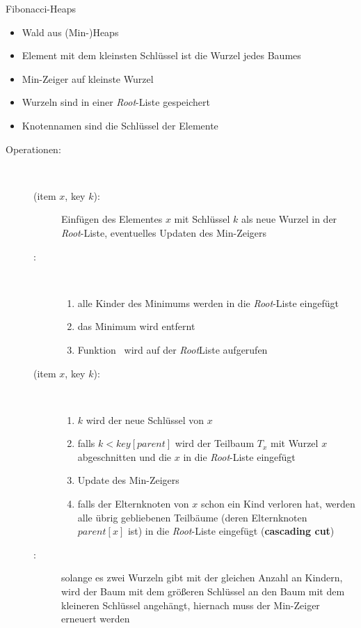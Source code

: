 \begin{TOP}{Fibonacci-Heaps}
\up\up\begin{itemize}
	\item Wald aus (Min-)Heaps
	\item Element mit dem kleinsten Schlüssel ist die Wurzel jedes Baumes
	\item Min-Zeiger auf kleinste Wurzel
	\item Wurzeln sind in einer \textit{Root}-Liste gespeichert
	\item Knotennamen sind die Schlüssel der Elemente
\end{itemize}

\begin{description}
	\item[Operationen:]\ \\\up
	\begin{description}
		\item[\insert(item $x$, key $k$):] Einfügen des Elementes $x$ mit Schlüssel $k$ als neue Wurzel in der \textit{Root}-Liste, eventuelles Updaten des Min-Zeigers
		\item[\exMin:]\ \\\up
			\begin{enumerate}
				\item alle Kinder des Minimums werden in die \textit{Root}-Liste eingefügt
				\item das Minimum wird entfernt
				\item Funktion \cons~wird auf der \textit{Root}Liste aufgerufen
			\end{enumerate}
		\item[\decKey(item $x$, key $k$):] \ \\\up
			\begin{enumerate}
				\item $k$ wird der neue Schlüssel von $x$
				\item falls $k<key[parent]$ wird der Teilbaum $T_x$ mit Wurzel $x$ abgeschnitten und die $x$ in die \textit{Root}-Liste eingefügt
				\item Update des Min-Zeigers
				\item falls der Elternknoten von $x$ schon ein Kind verloren hat, werden alle übrig gebliebenen Teilbäume (deren Elternknoten $parent[x]$ ist) in die \textit{Root}-Liste eingefügt (\textbf{cascading cut})
			\end{enumerate}
		\item[\cons:] solange es zwei Wurzeln gibt mit der gleichen Anzahl an Kindern, wird der Baum mit dem größeren Schlüssel an den Baum mit dem kleineren Schlüssel angehängt, hiernach muss der Min-Zeiger erneuert werden\\
		\algobreak
	\end{description}
\end{description}
\end{TOP}